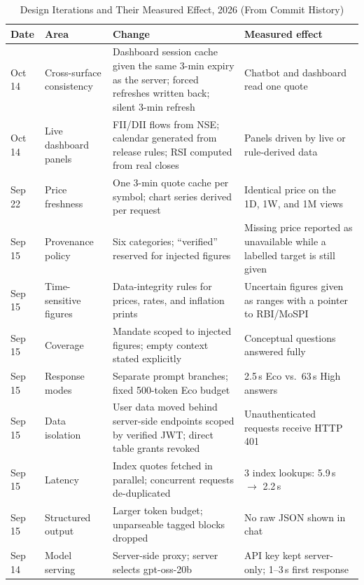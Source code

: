 \documentclass[conference]{IEEEtran}
\begin{document}
\begin{table}[t]
\caption{Design Iterations and Their Measured Effect, 2026 (From Commit History)}
\label{tab:devlog}
\centering
\footnotesize
\begin{tabular}{@{}L{1.0cm}L{3.6cm}L{6.2cm}L{6.0cm}@{}}
\toprule
Date & Area & Change & Measured effect \\
\midrule
Oct 14 & Cross-surface consistency & Dashboard session cache given the same 3-min expiry as the server; forced refreshes written back; silent 3-min refresh & Chatbot and dashboard read one quote \\
Oct 14 & Live dashboard panels & FII/DII flows from NSE; calendar generated from release rules; RSI computed from real closes & Panels driven by live or rule-derived data \\
Sep 22 & Price freshness & One 3-min quote cache per symbol; chart series derived per request & Identical price on the 1D, 1W, and 1M views \\
Sep 15 & Provenance policy & Six categories; ``verified'' reserved for injected figures & Missing price reported as unavailable while a labelled target is still given \\
Sep 15 & Time-sensitive figures & Data-integrity rules for prices, rates, and inflation prints & Uncertain figures given as ranges with a pointer to RBI/MoSPI \\
Sep 15 & Coverage & Mandate scoped to injected figures; empty context stated explicitly & Conceptual questions answered fully \\
Sep 15 & Response modes & Separate prompt branches; fixed 500-token Eco budget & 2.5\,s Eco vs.\ 63\,s High answers \\
Sep 15 & Data isolation & User data moved behind server-side endpoints scoped by verified JWT; direct table grants revoked & Unauthenticated requests receive HTTP 401 \\
Sep 15 & Latency & Index quotes fetched in parallel; concurrent requests de-duplicated & 3 index lookups: 5.9\,s $\rightarrow$ 2.2\,s \\
Sep 15 & Structured output & Larger token budget; unparseable tagged blocks dropped & No raw JSON shown in chat \\
Sep 14 & Model serving & Server-side proxy; server selects gpt-oss-20b & API key kept server-only; 1--3\,s first response \\
\bottomrule
\end{tabular}
\end{table}
\end{document}
